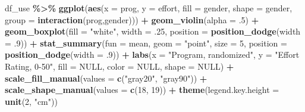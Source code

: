 \documentclass[
]{article}
\newenvironment{Shaded}{\begin{snugshade}}{\end{snugshade}}
\newcommand{\AttributeTok}[1]{\textcolor[rgb]{0.13,0.29,0.53}{#1}}
\newcommand{\ConstantTok}[1]{\textcolor[rgb]{0.56,0.35,0.01}{#1}}
\newcommand{\DecValTok}[1]{\textcolor[rgb]{0.00,0.00,0.81}{#1}}
\newcommand{\FunctionTok}[1]{\textcolor[rgb]{0.13,0.29,0.53}{\textbf{#1}}}
\newcommand{\NormalTok}[1]{#1}
\newcommand{\SpecialCharTok}[1]{\textcolor[rgb]{0.81,0.36,0.00}{\textbf{#1}}}
\newcommand{\StringTok}[1]{\textcolor[rgb]{0.31,0.60,0.02}{#1}}
\begin{document}
\begin{Shaded}
\begin{Highlighting}[]
\NormalTok{df\_use }\SpecialCharTok{\%\textgreater{}\%} 
  \FunctionTok{ggplot}\NormalTok{(}\FunctionTok{aes}\NormalTok{(}\AttributeTok{x =}\NormalTok{ prog,}
             \AttributeTok{y =}\NormalTok{ effort,}
             \AttributeTok{fill =}\NormalTok{ gender,}
             \AttributeTok{shape =}\NormalTok{ gender,}
             \AttributeTok{group =} \FunctionTok{interaction}\NormalTok{(prog,gender))) }\SpecialCharTok{+} 
  \FunctionTok{geom\_violin}\NormalTok{(}\AttributeTok{alpha =}\NormalTok{ .}\DecValTok{5}\NormalTok{) }\SpecialCharTok{+}
  \FunctionTok{geom\_boxplot}\NormalTok{(}\AttributeTok{fill =} \StringTok{"white"}\NormalTok{,}
               \AttributeTok{width =}\NormalTok{ .}\DecValTok{25}\NormalTok{,}
               \AttributeTok{position =} \FunctionTok{position\_dodge}\NormalTok{(}\AttributeTok{width =}\NormalTok{ .}\DecValTok{9}\NormalTok{)) }\SpecialCharTok{+}
  \FunctionTok{stat\_summary}\NormalTok{(}\AttributeTok{fun =}\NormalTok{ mean,}
               \AttributeTok{geom =} \StringTok{"point"}\NormalTok{,}
               \AttributeTok{size =} \DecValTok{5}\NormalTok{,}
               \AttributeTok{position =} \FunctionTok{position\_dodge}\NormalTok{(}\AttributeTok{width =}\NormalTok{ .}\DecValTok{9}\NormalTok{)) }\SpecialCharTok{+}
  \FunctionTok{labs}\NormalTok{(}\AttributeTok{x =} \StringTok{"Program, randomized"}\NormalTok{,}
       \AttributeTok{y =} \StringTok{"Effort Rating, 0{-}50"}\NormalTok{,}
       \AttributeTok{fill =} \ConstantTok{NULL}\NormalTok{,}
       \AttributeTok{color =} \ConstantTok{NULL}\NormalTok{,}
       \AttributeTok{shape =} \ConstantTok{NULL}\NormalTok{)  }\SpecialCharTok{+}
  \FunctionTok{scale\_fill\_manual}\NormalTok{(}\AttributeTok{values =} \FunctionTok{c}\NormalTok{(}\StringTok{"gray20"}\NormalTok{, }\StringTok{"gray90"}\NormalTok{)) }\SpecialCharTok{+}
  \FunctionTok{scale\_shape\_manual}\NormalTok{(}\AttributeTok{values =} \FunctionTok{c}\NormalTok{(}\DecValTok{18}\NormalTok{, }\DecValTok{19}\NormalTok{)) }\SpecialCharTok{+}
  \FunctionTok{theme}\NormalTok{(}\AttributeTok{legend.key.height =} \FunctionTok{unit}\NormalTok{(}\DecValTok{2}\NormalTok{, }\StringTok{"cm"}\NormalTok{))}
\end{Highlighting}
\end{Shaded}
\end{document}
